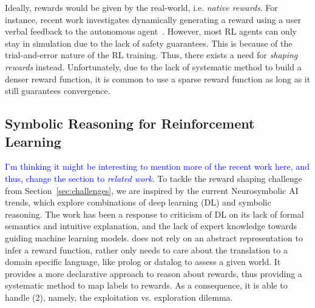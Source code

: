 Ideally, rewards would be given by the real-world, i.e. \textit{native rewards}. For instance, recent work investigates dynamically generating a reward 
using a user verbal feedback to the autonomous agent~\cite{gonzalez2010}.
%
%
However, most RL agents can only stay in simulation due to the lack of safety guarantees. This is because of the trial-and-error nature of the RL training. 
Thus, there exists a need for \textit{shaping rewards} instead.
%
Unfortunately, due to the lack of systematic method to build a denser reward function, 
it is common to use a sparse reward function as long as it still guarantees convergence.~

\subsection{Symbolic Reasoning for Reinforcement Learning} 
\label{symrl}
\textcolor{blue}
{I'm thinking it might be interesting to mention more of the recent work here, and thus, change the section to \emph{related work}.
}
To tackle the reward shaping challenge from Section~\ref{sec:challenges}, we are
inspired by the current Neurosymbolic AI trends, which explore
combinations of deep learning (DL) and symbolic reasoning.
%
The work has been a response to criticism of DL on its lack of formal
semantics and intuitive explanation, and the lack of expert knowledge
towards guiding machine learning models.
%
\dio{} does not rely on an abstract representation to infer a reward function, rather only needs 
to care about the translation to a domain specific language, like prolog or datalog to assess a given world. 
It provides a more declarative approach to reason about rewards, thus providing a systematic method to map 
labels to rewards. As a consequence, it is able to handle (2), namely, the exploitation vs. exploration
dilemma.
